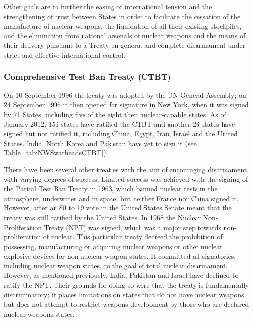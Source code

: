 \documentclass[twoside,titlepage,11pt,twocolumn,a4paper]{article}
\begin{document}
Other goals are to further the easing of international tension and the
strengthening of trust between States in order to facilitate the
cessation of the manufacture of nuclear weapons, the liquidation of
all their existing stockpiles, and the elimination from national
arsenals of nuclear weapons and the means of their delivery pursuant
to a Treaty on general and complete disarmament under strict and
effective international control. \citep{statement2005}

\subsubsection{Comprehensive Test Ban Treaty (CTBT)}
On 10 September 1996 the treaty was adopted by the UN General
Assembly; on 24 September 1996 it then opened for signature in New
York, when it was signed by 71 States, including five of the eight
then nuclear-capable states. As of January 2012, 156 states have
ratified the CTBT and another 26 states have signed but not ratified
it, including China, Egypt, Iran, Israel and the United States. India,
North Korea and Pakistan have yet to sign it (see
Table~\ref{tab:NWSwarheadsCTBT}).

There have been several other treaties with the aim of encouraging
disarmament, with varying degrees of success. Limited success was
achieved with the signing of the Partial Test Ban Treaty in 1963,
which banned nuclear tests in the atmosphere, underwater and in space,
but neither France nor China signed it. However, after an 80 to 19
vote in the United States Senate meant that the treaty was still
ratified by the United States. In 1968 the Nuclear Non-Proliferation
Treaty (NPT) was signed, which was a major step towards
non-proliferation of nuclear. This particular treaty decreed the
prohibition of possessing, manufacturing or acquiring nuclear weapons
or other nuclear explosive devices for non-nuclear weapon states. It
committed all signatories, including nuclear weapon states, to the
goal of total nuclear disarmament. However, as mentioned previously,
India, Pakistan and Israel have declined to ratify the NPT. Their
grounds for doing so were that the treaty is fundamentally
discriminatory; it places limitations on states that do not have
nuclear weapons but does not attempt to restrict weapons development
by those who are declared nuclear weapons states.
\end{document}
